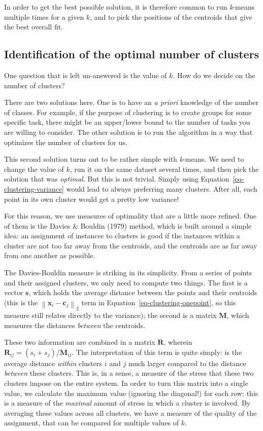 \documentclass[
  letterpaper,
]{scrbook}
\begin{document}
In order to get the best possible solution, it is therefore common to
run \emph{k}-means multiple times for a given \(k\), and to pick the
positions of the centroids that give the best overall fit.

\subsection{Identification of the optimal number of
clusters}\label{sec-clustering-optimality}

One question that is left un-answered is the value of \(k\). How do we
decide on the number of clusters?

There are two solutions here. One is to have an \emph{a priori}
knowledge of the number of classes. For example, if the purpose of
clustering is to create groups for some specific task, there might be an
upper/lower bound to the number of tasks you are willing to consider.
The other solution is to run the algorithm in a way that optimizes the
number of clusters for us.

This second solution turns out to be rather simple with \emph{k}-means.
We need to change the value of \(k\), run it on the same dataset several
times, and then pick the solution that was \emph{optimal}. But this is
not trivial. Simply using Equation~\ref{eq-clustering-variance} would
lead to always preferring many clusters. After all, each point in its
own cluster would get a pretty low variance!

For this reason, we use measures of optimality that are a little more
refined. One of them is the Davies \& Bouldin (1979) method, which is
built around a simple idea: an assignment of instances to clusters is
good if the instances within a cluster are not too far away from the
centroids, and the centroids are as far away from one another as
possible.

The Davies-Bouldin measure is striking in its simplicity. From a series
of points and their assigned clusters, we only need to compute two
things. The first is a vector \(\mathbf{s}\), which holds the average
distance between the points and their centroids (this is the
\(\left\|\mathbf{x}_i-\mathbf{c}_j\right\|_2\) term in
Equation~\ref{eq-clustering-onepoint}, so this measure still relates
directly to the variance); the second is a matrix \(\mathbf{M}\), which
measures the distances \emph{between} the centroids.

These two information are combined in a matrix \(\mathbf{R}\), wherein
\(\mathbf{R}_{ij} = (s_i + s_j)/\mathbf{M}_{ij}\). The interpretation of
this term is quite simply: is the average distance \emph{within}
clusters \(i\) and \(j\) much larger compared to the distance
\emph{between} these clusters. This is, in a sense, a measure of the
stress that these two clusters impose on the entire system. In order to
turn this matrix into a single value, we calculate the maximum value
(ignoring the diagonal!) for each row: this is a measure of the
\emph{maximal} amount of stress in which a cluster is involved. By
averaging these values across all clusters, we have a measure of the
quality of the assignment, that can be compared for multiple values of
\(k\).
\end{document}
